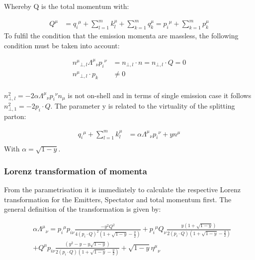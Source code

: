 Whereby Q is the total momentum with:

\begin{equation}
\begin{split}	
{Q}^{\mu} &= {q_i}^{\mu}+\displaystyle\sum\limits_{l=1}^m k_l^{\mu}+\displaystyle\sum\limits_{k=1}^m q_k^{\mu}={p_i}^{\mu}+\displaystyle\sum\limits_{k=1}^m p_k^{\mu}
\end{split}	
\end{equation}
To fulfil the condition that the emission momenta are massless, the following condition must be taken into account:

\begin{equation}
\begin{split}
	{n^{\mu}}_{\bot,l}{\Lambda^{\mu}}_{\nu}{p_i}^{\nu} &= {n_{\bot,l}} \cdot n = {n_{\bot,l}} \cdot Q =0\\
	{n^{\mu}}_{\bot,l}\cdot p_k &\neq0\\
\end{split}	
\end{equation}

$ {n}^2_{\bot,l} = -2\alpha{\Lambda^{\mu}}_{\nu}{p_i}^{\nu} n_{\mu} $ is not on-shell and in terms of single emission case it follows $ {n}^2_{\bot,1} = -2p_i\cdot Q $.
The parameter y is related to the virtuality of the splitting parton:

\begin{equation}
\begin{split}
{q_i}^{\mu} +\displaystyle\sum\limits_{l=1}^m k_l^{\mu}   &= \alpha{\Lambda^{\mu}}_{\nu}{p_i}^{\nu} +y{n}^{\mu}\\
    \end{split}
\end{equation}
With $ \alpha = \sqrt{1-y} $.
\subsubsection*{Lorenz transformation of momenta }
From the parametrisation it is immediately to calculate the respective Lorenz transformation for the Emitters, Spectator and total momentum first. The general definition of the transformation is given by:

\begin{equation}
\begin{split}	
&\alpha{\Lambda^{\mu}}_{\nu} = {p_i}^{\mu} p_{i\nu} \frac{-y^2 Q^2}{4(p_i\cdot Q)^2(1+\sqrt{1-y}-\frac{y}{2})}
+{p_i}^{\mu} Q_{\nu} \frac{y(1+\sqrt{1-y})}{2(p_i\cdot Q)(1+\sqrt{1-y}-\frac{y}{2})}\\
&+{Q}^{\mu} p_{i\nu} \frac{(y^2 -y-y\sqrt{1-y})}{2(p_i\cdot Q)(1+\sqrt{1-y}-\frac{y}{2})}+\sqrt{1-y} {\eta^{\mu}}_{\nu}\\
\end{split}
\end{equation}


